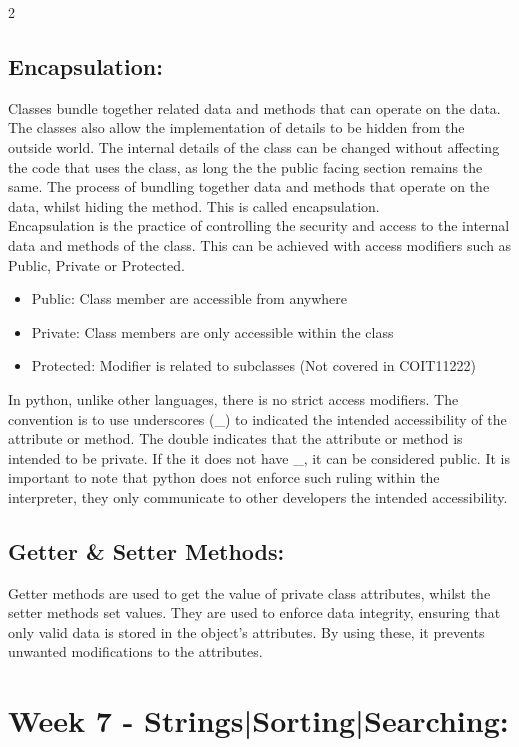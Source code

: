 \documentclass[a4paper]{report}
\begin{document}
\begin{flushleft}
\begin{multicols}{2}
	\subsection*{Encapsulation:}
	Classes bundle together related data and methods that can operate on the data. The classes also allow the implementation of details to be hidden from the outside world. The internal details of the class can be changed without affecting the code that uses the class, as long the the public facing section remains the same. The process of bundling together data and methods that operate on the data, whilst hiding the method. This is called encapsulation.\\
	Encapsulation is the practice of controlling the security and access to the internal data and methods of the class. This can be achieved with access modifiers such as Public, Private or Protected. 
	\begin{itemize}
		\item Public: Class member are accessible from anywhere
		\item Private: Class members are only accessible within the class
		\item Protected: Modifier is related to subclasses (Not covered in COIT11222)
	\end{itemize}\hfill\break
	In python, unlike other languages, there is no strict access modifiers. The convention is to use underscores (\_) to indicated the intended accessibility of the attribute or method. The double indicates that the attribute or method is intended to be private. If the it does not have \_, it can be considered public. It is important to note that python does not enforce such ruling within the interpreter, they only communicate to other developers the intended accessibility.
	
	\subsection*{Getter \& Setter Methods:}
	Getter methods are used to get the value of private class attributes, whilst the setter methods set values. They are used to enforce data integrity, ensuring that only valid data is stored in the object's attributes. By using these, it prevents unwanted modifications to the attributes.

	\section*{Week 7 - Strings|Sorting|Searching:}

\end{multicols}
\end{flushleft}
\end{document}
